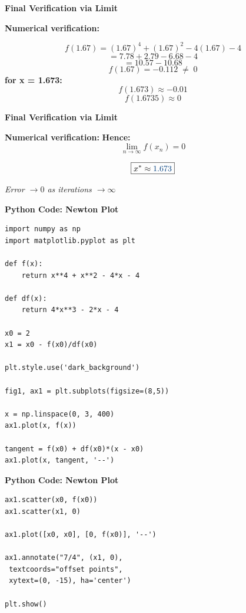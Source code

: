 \documentclass[12pt]{beamer}
\begin{document}
\begin{frame}{\textbf{Final Verification via Limit}}

\begin{center}
\textbf{Numerical verification:}

\[
f(1.67) = (1.67)^4 + (1.67)^2 - 4(1.67) - 4
\]
\[
= 7.78 + 2.79 - 6.68 - 4
\]
\[
= 10.57 - 10.68
\]
\[
f(1.67) = -0.112 \;\neq\; 0
\]
\vspace{0.8em}
\textbf{for x = 1.673:}
\[
f(1.673) \approx -0.01
\]
\[
f(1.6735) \approx 0
\]

\vfill
\end{center}
\end{frame}

\begin{frame}{\textbf{Final Verification via Limit}}

\begin{center}
\textbf{Numerical verification:}
\textbf{Hence:}
\[
\lim_{n \to \infty} f(x_n) = 0
\]


\[
\boxed{
x^* \approx \textcolor{madblue}{1.673}
}
\]

\vspace{1em}

\textit{Error $\to 0$ as iterations $\to \infty$}

\vfill
\end{center}
\end{frame}

\begin{frame}[fragile]{\textbf{Python Code: Newton Plot}}
\begin{lstlisting}
import numpy as np
import matplotlib.pyplot as plt

def f(x):
    return x**4 + x**2 - 4*x - 4

def df(x):
    return 4*x**3 - 2*x - 4

x0 = 2
x1 = x0 - f(x0)/df(x0)

plt.style.use('dark_background')

fig1, ax1 = plt.subplots(figsize=(8,5))

x = np.linspace(0, 3, 400)
ax1.plot(x, f(x))

tangent = f(x0) + df(x0)*(x - x0)
ax1.plot(x, tangent, '--')
\end{lstlisting}
\end{frame}

\begin{frame}[fragile]{\textbf{Python Code: Newton Plot}}
\begin{lstlisting}
ax1.scatter(x0, f(x0))
ax1.scatter(x1, 0)

ax1.plot([x0, x0], [0, f(x0)], '--')

ax1.annotate("7/4", (x1, 0),
 textcoords="offset points",
 xytext=(0, -15), ha='center')

plt.show()
\end{lstlisting}
\end{frame}
\end{document}
